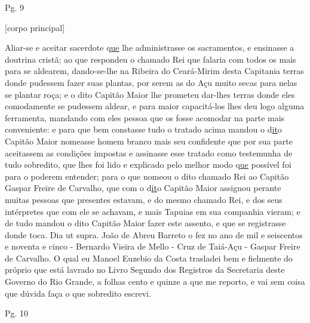 \begin{refsection}

    \vspace{5mm}

    \noindent{}Pg. 9

    \vspace{1ex}

    \noindent{}[corpo principal] 

    \vspace{1ex}

    Aliar-se e aceitar sacerdote q\underline{ue} lhe administrasse os sacramentos, e ensinasse a doutrina cristã; ao que respondeu o chamado Rei que falaria com todos os mais para se aldearem, dando-se-lhe na Ribeira do Ceará-Mirim desta Capitania terras donde pudessem fazer suas plantas, por serem as do Açu muito secas para nelas se plantar roça; e o dito Capitão Maior lhe prometeu dar-lhes terras donde eles comodamente se pudessem aldear, e para maior capacitá-los lhes deu logo alguma ferramenta, mandando com eles pessoa que os fosse acomodar na parte mais conveniente: e para que bem constasse tudo o tratado acima mandou o d\underline{it}o Capitão Maior nomeasse homem branco mais seu confidente que por sua parte aceitassem as condições impostas e assinasse esse tratado como testemunha de tudo sobredito, que lhes foi lido e explicado pelo melhor modo q\underline{ue} possível foi para o poderem entender; para o que nomeou o dito chamado Rei ao Capitão Gaspar Freire de Carvalho, que com o d\underline{it}o Capitão Maior assignou perante muitas pessoas que presentes estavam, e do mesmo chamado Rei, e dos seus intérpretes que com ele se achavam, e mais Tapuias em sua companhia vieram; e de tudo mandou o dito Capitão Maior fazer este assento, e que se registrasse donde toca. Dia ut supra. João de Abreu Barreto o fez no ano de mil e seiscentos e noventa e cinco - Bernardo Vieira de Mello - Cruz de Taiá-Açu - Gaspar Freire de Carvalho. O qual eu Manoel Euzebio da Costa trasladei bem e fielmente do próprio que está lavrado no Livro Segundo dos Registros da Secretaria deste Governo do Rio Grande, a folhas cento e quinze a que me reporto, e vai sem coisa que dúvida faça o que sobredito escrevi. 


    \vspace{5mm}

    \noindent{}Pg. 10

    \vspace{1ex}


\end{refsection}
